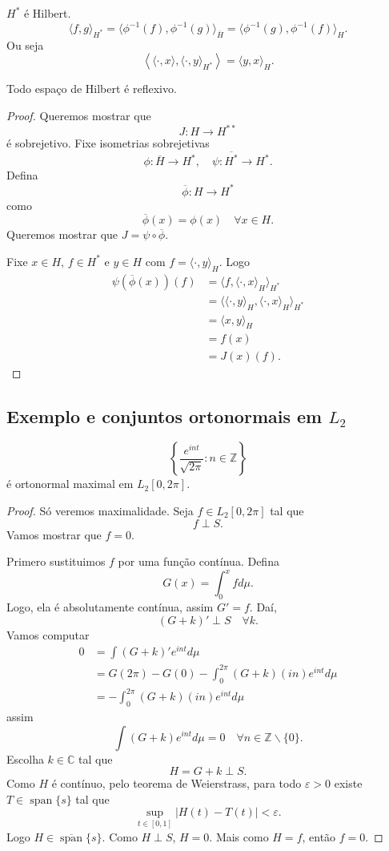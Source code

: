 \documentclass[portuguese]{article}
\theoremstyle{definition}
\newcommand{\Z}{\mathbb{Z}}
\newcommand{\C}{\mathbb{C}}
\begin{document}
\begin{coro}
	$H^*$ é Hilbert.
	\[\langle f,g\rangle_{H^*}=\langle\phi^{-1}(f),\phi^{-1}(g)\rangle_{\overline{H}}=\langle \phi^{-1}(g),\phi^{-1}(f)\rangle_H.\]
		Ou seja
		\[\left\langle\langle\cdot,x\rangle,\langle\cdot,y\rangle_{H^{*}}\right\rangle=\langle y,x\rangle_H.\]
\end{coro}
\begin{coro}
	Todo espaço de Hilbert é reflexivo.
\end{coro}
\begin{proof}
	Queremos mostrar que
	\[J:H\to H^{**}\]
	é sobrejetivo. Fixe isometrias sobrejetivas
	\[\phi:\overline{H}\to H^*,\quad\psi:\overline{H^*}\to H^*.\]
	Defina
	\[\overline{\phi}:H\to H^*\]
	como
	\[\overline{\phi}(x)=\phi(x)\quad\forall x\in H.\]
	Queremos mostrar que $J=\psi\circ\overline{\phi}$.

	Fixe $x\in H$, $f\in H^*$ e $y\in H$ com $f=\langle\cdot,y\rangle_H$. Logo
	\begin{align*}
		\psi(\overline{\phi}(x))(f)&=\langle f,\langle\cdot,x\rangle_H\rangle_{H^*}\\
		&=\langle\langle\cdot,y\rangle_H,\langle\cdot,x\rangle_H\rangle_{H^*}\\
		&=\langle x,y\rangle_H\\
		&=f(x)\\
		&=J(x)(f).
	\end{align*}
\end{proof}

\subsection{Exemplo e conjuntos ortonormais em $L_2$}
\begin{prop}
	\[\left\{\frac{e^{int}}{\sqrt{2\pi}}:n\in\Z\right\}\]
	é ortonormal maximal em $L_2[0,2\pi]$.
\end{prop}
\begin{proof}
	Só veremos maximalidade. Seja $f\in L_2[0,2\pi]$ tal que
	\[f\perp S.\]
	Vamos mostrar que $f=0$.
	
	Primero sustituimos $f$ por uma função contínua. Defina
	\[G(x)=\int_0^xfd\mu.\]
	Logo, {\color{orange}ela é absolutamente contínua}, assim $G'=f$. Daí,
	\[(G+k)'\perp S\quad\forall k.\]
	Vamos computar
	\begin{align*}
		0&=\int(G+k)'e^{int}d\mu\\
		&=G(2\pi)-G(0)-\int_0^{2\pi}(G+k)(in)e^{int}d\mu\\
		&=-\int_0^{2\pi}(G+k)(in)e^{int}d\mu
	\end{align*}
	assim
	\[\int(G+k)e^{int}d\mu=0\quad\forall n\in \Z\backslash\{0\}.\]
	Escolha $k\in\C$ tal que
	\[H=G+k\perp S.\]
	Como $H$ é contínuo, pelo teorema de Weierstrass, para todo $\varepsilon>0$ existe $T\in\operatorname{span}\{s\}$ tal que
	\[\sup_{t\in[0,1]}|H(t)-T(t)|<\varepsilon.\]
	Logo $H\in\overline{\operatorname{span}}\{s\}$. Como $H\perp S$, $H=0$. Mais como $H=f$, então $f=0$.
\end{proof}
\end{document}

